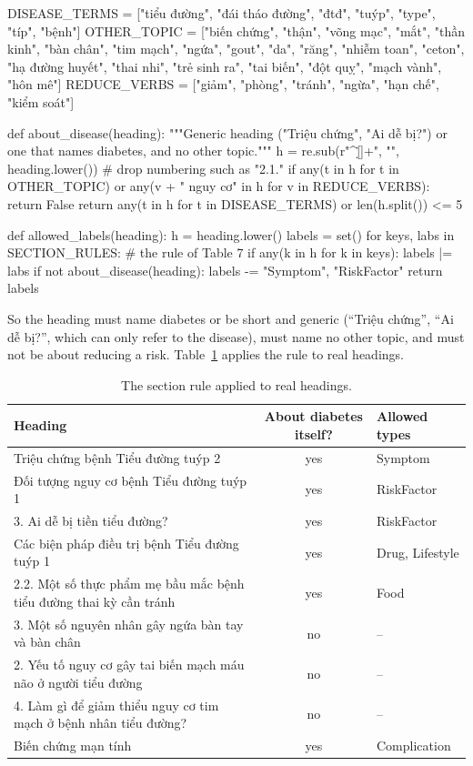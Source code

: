 \documentclass[11pt, a4paper]{article}
\begin{document}
\begin{codeblock}
DISEASE_TERMS = ["tiểu đường", "đái tháo đường", "đtđ", "tuýp", "type", "típ", "bệnh"]
OTHER_TOPIC   = ["biến chứng", "thận", "võng mạc", "mắt", "thần kinh", "bàn chân", "tim mạch",
                 "ngứa", "gout", "da", "răng", "nhiễm toan", "ceton", "hạ đường huyết",
                 "thai nhi", "trẻ sinh ra", "tai biến", "đột quỵ", "mạch vành", "hôn mê"]
REDUCE_VERBS  = ["giảm", "phòng", "tránh", "ngừa", "hạn chế", "kiểm soát"]

def about_disease(heading):
    """Generic heading ("Triệu chứng", "Ai dễ bị?") or one that names diabetes, and no other topic."""
    h = re.sub(r"^[\d\.\s]+", "", heading.lower())          # drop numbering such as "2.1."
    if any(t in h for t in OTHER_TOPIC) or any(v + " nguy cơ" in h for v in REDUCE_VERBS):
        return False
    return any(t in h for t in DISEASE_TERMS) or len(h.split()) <= 5

def allowed_labels(heading):
    h = heading.lower()
    labels = set()
    for keys, labs in SECTION_RULES:                          # the rule of Table 7
        if any(k in h for k in keys):
            labels |= labs
    if not about_disease(heading):
        labels -= {"Symptom", "RiskFactor"}
    return labels
\end{codeblock}

So the heading must name diabetes or be short and generic (``Triệu chứng'', ``Ai dễ bị?'', which can only refer to the disease), must name no other topic, and must not be about reducing a risk. Table~\ref{tab:headings} applies the rule to real headings.

\begin{table}[H]
\centering
\small
\caption{The section rule applied to real headings.}
\label{tab:headings}
\begin{tabularx}{\textwidth}{X c l}
\toprule
Heading & About diabetes itself? & Allowed types \\
\midrule
Triệu chứng bệnh Tiểu đường tuýp 2 & yes & Symptom \\
Đối tượng nguy cơ bệnh Tiểu đường tuýp 1 & yes & RiskFactor \\
3. Ai dễ bị tiền tiểu đường? & yes & RiskFactor \\
Các biện pháp điều trị bệnh Tiểu đường tuýp 1 & yes & Drug, Lifestyle \\
2.2. Một số thực phẩm mẹ bầu mắc bệnh tiểu đường thai kỳ cần tránh & yes & Food \\
3. Một số nguyên nhân gây ngứa bàn tay và bàn chân & no & -- \\
2. Yếu tố nguy cơ gây tai biến mạch máu não ở người tiểu đường & no & -- \\
4. Làm gì để giảm thiểu nguy cơ tim mạch ở bệnh nhân tiểu đường? & no & -- \\
Biến chứng mạn tính & yes & Complication \\
\bottomrule
\end{tabularx}
\end{table}
\end{document}
